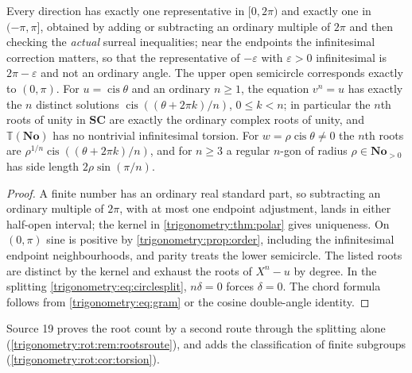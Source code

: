 \documentclass[11pt,letterpaper]{article}
\numberwithin{equation}{section}
\theoremstyle{definition}
\theoremstyle{remark}
\newcommand{\No}{\mathbf{No}}
\newcommand{\SC}{\mathbf{SC}}
\newcommand{\TT}{\mathbb T}
\newcommand{\eps}{\varepsilon}
\newcommand{\cis}{\operatorname{cis}}
\begin{document}
\begin{corollary}\label{trigonometry:cor:representatives}
Every direction has exactly one representative in $[0,2\pi)$ and exactly one in $(-\pi,\pi]$,
obtained by adding or subtracting an ordinary multiple of $2\pi$ and then checking the
\emph{actual} surreal inequalities; near the endpoints the infinitesimal correction matters, so
that the representative of $-\eps$ with $\eps>0$ infinitesimal is $2\pi-\eps$ and not an ordinary
angle. The upper open semicircle corresponds exactly to $(0,\pi)$. For $u=\cis\theta$ and an
ordinary $n\ge1$, the equation $v^n=u$ has exactly the $n$ distinct solutions
$\cis((\theta+2\pi k)/n)$, $0\le k<n$; in particular the $n$th roots of unity in $\SC$ are exactly
the ordinary complex roots of unity, and $\TT(\No)$ has no nontrivial infinitesimal torsion. For
$w=\rho\cis\theta\ne0$ the $n$th roots are $\rho^{1/n}\cis((\theta+2\pi k)/n)$, and for $n\ge3$ a
regular $n$-gon of radius $\rho\in\No_{>0}$ has side length $2\rho\sin(\pi/n)$.
\end{corollary}
\begin{proof}
A finite number has an ordinary real standard part, so subtracting an ordinary multiple of $2\pi$,
with at most one endpoint adjustment, lands in either half-open interval; the kernel in
\cref{trigonometry:thm:polar} gives uniqueness. On $(0,\pi)$ sine is positive by
\cref{trigonometry:prop:order}, including the infinitesimal endpoint neighbourhoods, and parity
treats the lower semicircle. The listed roots are distinct by the kernel and exhaust the roots of
$X^n-u$ by degree. In the splitting \cref{trigonometry:eq:circlesplit}, $n\delta=0$ forces
$\delta=0$. The chord formula follows from \cref{trigonometry:eq:gram} or the cosine double-angle
identity.
\end{proof}
Source 19 proves the root count by a second route through the splitting alone
(\cref{trigonometry:rot:rem:rootsroute}), and adds the classification of finite subgroups
(\cref{trigonometry:rot:cor:torsion}).
\end{document}

